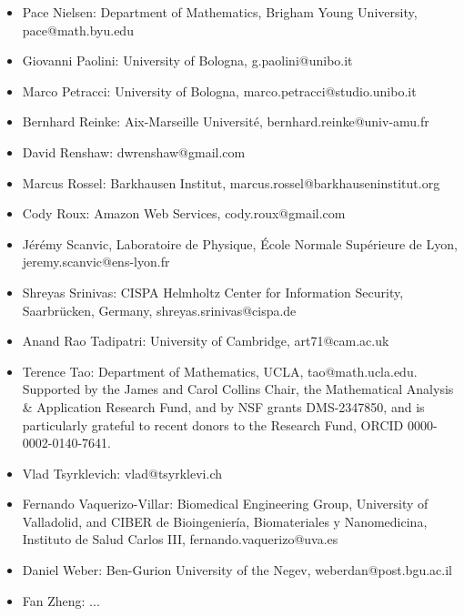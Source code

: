 \begin{itemize}
    \item Pace Nielsen: Department of Mathematics, Brigham Young University, pace@math.byu.edu
    \item Giovanni Paolini: University of Bologna, g.paolini@unibo.it
    \item Marco Petracci: University of Bologna, marco.petracci@studio.unibo.it
    \item Bernhard Reinke: Aix-Marseille Université, bernhard.reinke@univ-amu.fr
    \item David Renshaw: dwrenshaw@gmail.com
    \item Marcus Rossel: Barkhausen Institut, marcus.rossel@barkhauseninstitut.org
    \item Cody Roux: Amazon Web Services, cody.roux@gmail.com
    \item J\'er\'emy Scanvic, Laboratoire de Physique, École Normale Supérieure de Lyon, jeremy.scanvic@ens-lyon.fr
    \item Shreyas Srinivas: CISPA Helmholtz Center for Information Security, Saarbr\"{u}cken, Germany, shreyas.srinivas@cispa.de
    \item Anand Rao Tadipatri: University of Cambridge, art71@cam.ac.uk
    \item Terence Tao: Department of Mathematics, UCLA, tao@math.ucla.edu. Supported by the James and Carol Collins Chair, the Mathematical Analysis \& Application Research Fund, and by NSF grants DMS-2347850, and is particularly grateful to recent donors to the Research Fund, ORCID 0000-0002-0140-7641.
    \item Vlad Tsyrklevich: vlad@tsyrklevi.ch
    \item Fernando Vaquerizo-Villar: Biomedical Engineering Group, University of Valladolid, and CIBER de Bioingeniería, Biomateriales y Nanomedicina, Instituto de Salud Carlos III, fernando.vaquerizo@uva.es
    \item Daniel Weber: Ben-Gurion University of the Negev, weberdan@post.bgu.ac.il
    \item Fan Zheng: ...

\end{itemize}
